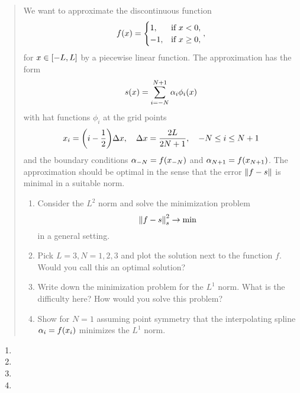 \documentclass[english]{exercise}
\begin{document}
	\begin{quote}
		We want to approximate the discontinuous function
		\[
			f\parentheses*{x} = \begin{cases}
				1, & \text{if }x < 0,\\
				-1, & \text{if }x \ge 0,
			\end{cases},
		\]
		for \(x \in \brackets*{-L, L}\) by a piecewise linear function.
		The approximation has the form
		\[
			s\parentheses*{x} = \sum_{i = -N}^{N + 1}\alpha_i \phi_i\parentheses*{x}
		\]
		with hat functions \(\phi_i\) at the grid points
		\[
			x_i = \parentheses*{i - \frac{1}{2}}\Delta x, \quad \Delta x = \frac{2L}{2N + 1}, \quad -N \le i \le N + 1
		\]
		and the boundary conditions \(\alpha_{-N} = f\parentheses*{x_{-N}}\) and \(\alpha_{N + 1} = f\parentheses*{x_{N + 1}}\).
		The approximation should be optimal in the sense that the error \(\norm*{f - s}\) is minimal in a suitable norm.
		\begin{enumerate}
			\item Consider the \(L^2\) norm and solve the minimization problem
			\[
				\norm*{f - s}_s^2 \to \min
			\]
			in a general setting.
			\item Pick \(L = 3, N = 1, 2, 3\) and plot the solution next to the function \(f\).
			Would you call this an optimal solution?
			\item Write down the minimization problem for the \(L^1\) norm.
			What is the difficulty here?
			How would you solve this problem?
			\item Show for \(N = 1\) assuming point symmetry that the interpolating spline \(\alpha_i = f\parentheses*{x_i}\) minimizes the \(L^1\) norm.
		\end{enumerate}
	\end{quote}

	\begin{enumerate}
		\item
		\item
		\item
		\item
	\end{enumerate}
\end{document}

